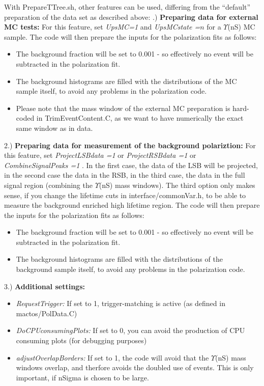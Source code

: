 \documentclass{article}
\begin{document}
With PrepareTTree.sh, other features can be used, differing from the ``default'' preparation of the data set as described above:
\newline
{}.) {\bf Preparing data for external MC tests:} For this feature, set \emph{UpsMC=1} and \emph{UpsMCstate =$n$} for a $\Upsilon$(nS) MC sample. The code will then prepare the inputs for the polarization fits as follows:
\begin{itemize}
\item The background fraction will be set to 0.001 - so effectively no event will be subtracted in the polarization fit.
\item The background histograms are filled with the distributions of the MC sample itself, to avoid any problems in the polarization code.
\item Please note that the mass window of the external MC preparation is hard-coded in TrimEventContent.C, as we want to have numerically the exact same window as in data. 
\end{itemize}
2.) {\bf Preparing data for measurement of the background polariztion:} For this feature, set \emph{ProjectLSBdata =1} or \emph{ProjectRSBdata =1} or \emph{CombineSignalPeaks =1} . In the first case, the data of the LSB will be projected, in the second case the data in the RSB, in the third case, the data in the full  signal region (combining the $\Upsilon$(nS) mass windows). The third option only makes sense, if you change the lifetime cuts in interface/commonVar.h, to be able to measure the background enriched high lifetime region.
The code will then prepare the inputs for the polarization fits as follows:
\begin{itemize}
\item The background fraction will be set to 0.001 - so effectively no event will be subtracted in the polarization fit.
\item The background histograms are filled with the distributions of the background sample itself, to avoid any problems in the polarization code.
\end{itemize}
3.) {\bf Additional settings:}
\begin{itemize}
\item \emph{RequestTrigger:} If set to 1, trigger-matching is active (as defined in mactos/PolData.C)
\item \emph{DoCPUconsumingPlots:} If set to 0, you can avoid the production of CPU consuming plots (for debugging purposes)
\item \emph{adjustOverlapBorders:} If set to 1, the code will avoid that the $\Upsilon$(nS) mass windows overlap, and therfore avoids the doubled use of events. This is only important, if nSigma is chosen to be large.
\end{itemize}
\end{document}
